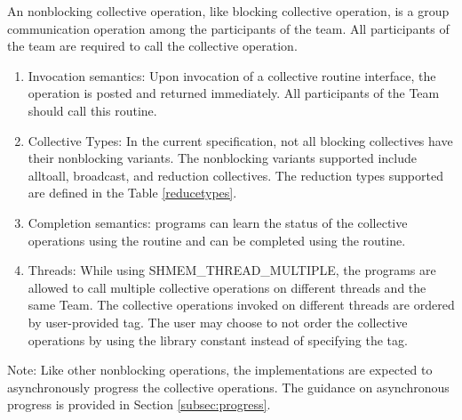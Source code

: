 An \openshmem nonblocking collective operation, like blocking collective
operation, is a group communication operation among the
participants of the team. All participants of the team are required to call the
collective operation.

\begin{enumerate}

\item Invocation semantics: Upon invocation of a collective routine interface,
the operation is posted and returned immediately. All participants of the Team
should call this routine.

\item Collective Types: In the current specification, not all blocking collectives have
their nonblocking variants. The nonblocking variants supported include alltoall,
broadcast, and reduction collectives. The reduction types supported
are defined in the Table \ref{reducetypes}. 

\item Completion semantics:  \openshmem programs can learn the status of the collective operations
using the  routine and can be completed using
the  routine.

\item Threads: While using SHMEM\_THREAD\_MULTIPLE, the \openshmem
programs are allowed to call multiple collective operations on different threads
and the same Team. The collective operations invoked on different threads
are ordered by user-provided tag. The user may choose to not order the
collective operations by using the library constant
 instead of specifying the tag.

\end{enumerate}

Note: Like other nonblocking \openshmem operations, the implementations are
expected to asynchronously progress the collective operations. The guidance on
asynchronous progress is provided in Section \ref{subsec:progress}.



